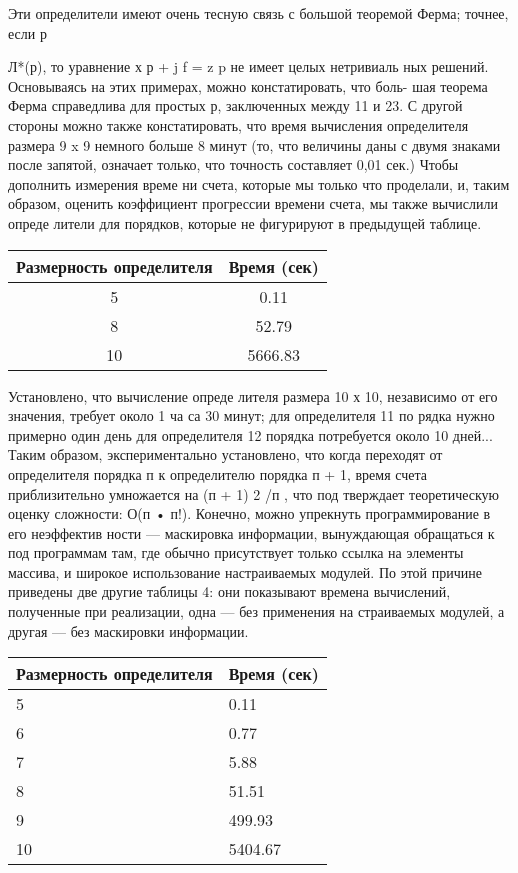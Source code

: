 Эти определители
имеют очень тесную связь с
большой теоремой Фер­ма;
точнее, если р { Л*(р),
то уравнение х р + j f = z p
не имеет целых нетривиаль­
ных решений. Основываясь
на этих примерах, можно
констатировать, что боль-
шая теорема Ферма справедлива для простых р, заключенных между
11 и 23. С другой стороны можно также констатировать, что время
вычисления определителя размера 9 x 9 немного больше 8 минут (то,
что величины даны с двумя знаками после запятой, означает только,
что точность составляет 0,01 сек.) Чтобы дополнить измерения време­
ни счета, которые мы только что проделали, и, таким образом, оценить
коэффициент прогрессии времени счета, мы также вычислили опреде­
лители для порядков, которые не фигурируют в предыдущей таблице.

\newpage
\begin{wraptable}{l}{8cm}
\begin{tabular}{|c|c|}
\hline
Размерность определителя & Время (сек) \\ \hline
5 & 0.11 \\
8 & 52.79 \\
10 & 5666.83 \\ \hline
\end{tabular}
\end{wraptable}
Установлено, что вычисление опреде­
лителя размера 10 х 10, независимо
от его значения, требует около 1 ча­
са 30 минут; для определителя 11 по­
рядка нужно примерно один день для
определителя 12 порядка потребуется
около 10 дней... Таким образом, экспериментально установлено, что
когда переходят от определителя порядка п к определителю порядка
п + 1, время счета приблизительно умножается на (п + 1) 2 /п , что под­
тверждает теоретическую оценку сложности: О(п • п!).
Конечно, можно упрекнуть программирование в его неэффектив­
ности — маскировка информации, вынуждающая обращаться к под­
программам там, где обычно присутствует только ссылка на элементы
массива, и широкое использование настраиваемых модулей. По этой
причине приведены две другие таблицы 4: они показывают времена
вычислений, полученные при реализации, одна — без применения на­
страиваемых модулей, а другая — без маскировки информации.

\begin{multicols}{2}
\begin{tabular}{|p{2.75cm}|p{2.75cm}|}
\hline
Размерность определителя & Время  (сек) \\ \hline
5 & 0.11 \\
6 & 0.77 \\
7 & 5.88 \\
8 & 51.51 \\
9 & 499.93 \\
10 & 5404.67 \\ \hline
\end{tabular}


\end{multicols}}
